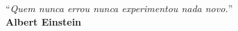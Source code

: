 \documentclass[twocolumn,oneside,a4paper,11pt]{article}
\begin{document}
\begin{enumerate}
						
\end{enumerate}
	
\flushbottom
\flushright
``\textit{Quem nunca errou nunca experimentou nada novo.}''\\\textbf{Albert Einstein}
	
\end{document}
